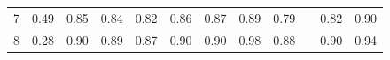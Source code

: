 \documentclass[twoside,11pt]{article}
\begin{document}
\begin{table}[H]
{\begin{tabular}{ccccccccclcc}
\multicolumn{1}{|c|}{7}                                                                           & \multicolumn{1}{c|}{0.49}                                                           & \multicolumn{1}{c|}{0.85}                                                                      & \multicolumn{1}{c|}{0.84}                                                                & \multicolumn{1}{c|}{0.82}                                                                & \multicolumn{1}{c|}{0.86}                                                                & \multicolumn{1}{c|}{\cellcolor[HTML]{ECF4FF}0.87}                                           & \multicolumn{1}{c|}{\cellcolor[HTML]{FFCCC9}0.89}                                           & \multicolumn{1}{c|}{0.79}                                                                   & \multicolumn{1}{l|}{}                    & \multicolumn{1}{c|}{0.82}                                                                      & \multicolumn{1}{c|}{0.90}                                                                      \\ \cline{1-1}
\multicolumn{1}{|c|}{8}                                                                           & \multicolumn{1}{c|}{0.28}                                                              & \multicolumn{1}{c|}{\cellcolor[HTML]{ECF4FF}0.90}                                              & \multicolumn{1}{c|}{0.89}                                                                & \multicolumn{1}{c|}{0.87}                                                                & \multicolumn{1}{c|}{\cellcolor[HTML]{ECF4FF}0.90}                                        & \multicolumn{1}{c|}{\cellcolor[HTML]{ECF4FF}0.90}                                           & \multicolumn{1}{c|}{\cellcolor[HTML]{FFCCC9}0.98}                                           & \multicolumn{1}{c|}{0.88}                                                                   & \multicolumn{1}{l|}{}                    & \multicolumn{1}{c|}{0.90}                                                                      & \multicolumn{1}{c|}{0.94}                                                                      \\ \cline{1-1}

\end{tabular}}
\end{table}
\end{document}
